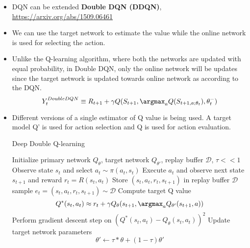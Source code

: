 \documentclass[a4paper]{article}
\begin{document}
\begin{itemize}
    \item DQN can be extended \textbf{Double DQN (DDQN)}, \url{https://arxiv.org/abs/1509.06461}
    \item We can use the target network to estimate the value while the online network is used for selecting the action.
    \item Unlike the Q-learning algorithm, where both the networks are updated with equal probability, in Double DQN, only the online network will be updates since the target network is updated towards online network as according to the DQN.
    \begin{equation*}
        Y_t^{DoubleDQN}\equiv R_{t+1}+\gamma Q(S_{t+1},\argmax_aQ(S_{t+1,a;\theta_t}),\theta_t^-)
    \end{equation*}
    \item Different versions of a single estimator of Q value is being used. A target model Q' is used for action selection and Q is used for action evaluation.
    \begin{algorithm}[H]
        \caption{Deep Double Q-learning}
        \begin{algorithmic}[1]
            \State Initialize primary network $Q_\theta$, target network $Q_{\theta'}$, replay buffer $\mathcal{D}$, $\tau << 1$
                    \State Observe state $s_t$ and select $a_t\sim \pi(a_t,s_t)$
                    \State Execute $a_t$ and observe next state $s_{t+1}$ and reward $r_t=R(s_t,a_t)$
                    \State Store $(s_t,a_t,r_t,s_{t+1})$ in replay buffer $\mathcal{D}$
                \EndFor
                    \State sample $e_t=(s_t,a_t,r_t,s_{t+1})\sim \mathcal{D}$
                    \State Compute target Q value
                    \begin{equation*}
                        Q^*(s_t,a_t)\approx r_t+\gamma Q_\theta(s_{t+1},\argmax_a Q_{\theta'}(s_{t+1},a))
                    \end{equation*}
                    \State Perform gradient descent step on $(Q^*(s_t,a_t)-Q_\theta(s_t,a_t))^2$
                    \State Update target network parameters
                    \begin{equation*}
                        \theta'\gets \tau * \theta + (1-\tau) \theta'
                    \end{equation*}
                \EndFor
            \EndFor
        \end{algorithmic}
    \end{algorithm}

\end{itemize}
\end{document}
